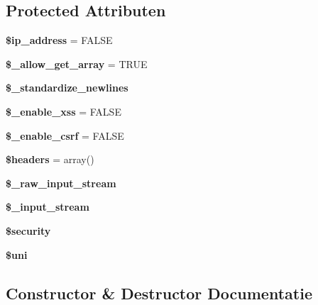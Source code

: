 \subsection*{Protected Attributen}
\begin{DoxyCompactItemize}
\item 
\mbox{\label{class_c_i___input_a614e10d1ab6dcf06fa7fef37af7b7eee}} 
{\bfseries \$ip\+\_\+address} = F\+A\+L\+SE
\item 
\mbox{\label{class_c_i___input_a359b1debb6f1d80e345d6215af6946fb}} 
{\bfseries \$\+\_\+allow\+\_\+get\+\_\+array} = T\+R\+UE
\item 
\mbox{\label{class_c_i___input_ad9ebdfce8f992b3a41aaf64ea8782933}} 
{\bfseries \$\+\_\+standardize\+\_\+newlines}
\item 
\mbox{\label{class_c_i___input_a42b707bea5d9604a7460e953d9e39d7d}} 
{\bfseries \$\+\_\+enable\+\_\+xss} = F\+A\+L\+SE
\item 
\mbox{\label{class_c_i___input_a463c89c07e7cf7f5e4337a2a8e460d17}} 
{\bfseries \$\+\_\+enable\+\_\+csrf} = F\+A\+L\+SE
\item 
\mbox{\label{class_c_i___input_a52500036ee807241b8b4b7e2367c49ef}} 
{\bfseries \$headers} = array()
\item 
\mbox{\label{class_c_i___input_a6f70bcba6388b55275db11f519649441}} 
{\bfseries \$\+\_\+raw\+\_\+input\+\_\+stream}
\item 
\mbox{\label{class_c_i___input_aa67cd17f9c04d6c58d10a80630e4faf2}} 
{\bfseries \$\+\_\+input\+\_\+stream}
\item 
\mbox{\label{class_c_i___input_a7ef3408af92597c92305e22f79e67d61}} 
{\bfseries \$security}
\item 
\mbox{\label{class_c_i___input_a6ed6e0f7f970550e288f83845eec6393}} 
{\bfseries \$uni}
\end{DoxyCompactItemize}


\subsection{Constructor \& Destructor Documentatie}
\mbox{\label{class_c_i___input_a095c5d389db211932136b53f25f39685}} 
